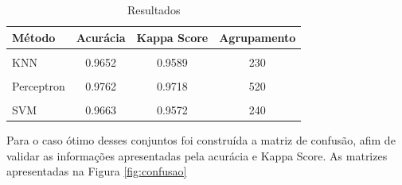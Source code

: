 \documentclass[12pt]{article}
\begin{document}
	\begin{table}[ht]
		\centering
		\caption{Resultados}
		\label{table:resultados}
		\smallskip
		\begin{tabular}{|l|c|c|c|}
			\hline
			Método& Acurácia & Kappa Score& Agrupamento \\[0.5ex]
			\hline
			&&&\\[-2ex]
			KNN &0.9652 & 0.9589 &230\\[0.5ex]
			\hline
			&&&\\[-2ex]
			Perceptron &0.9762 &0.9718 &520\\[0.5ex]
			\hline	
			&&&\\[-2ex]
			SVM & 0.9663 &0.9572& 240\\[0.5ex]
			\hline
		\end{tabular}
	\end{table}
	
	
	Para o caso ótimo desses conjuntos foi construída a matriz de confusão, afim de validar as informações apresentadas pela acurácia e Kappa Score. As matrizes apresentadas na Figura \ref{fig:confusao}
	
\end{document}
